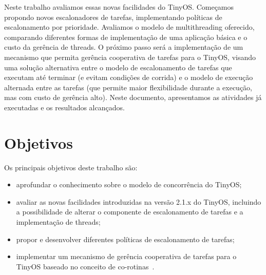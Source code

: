 \documentclass[a4paper, 10pt]{article}
\begin{document}
Neste trabalho avaliamos essas novas facilidades do TinyOS.
Começamos propondo novos escalonadores de tarefas, implementando políticas de escalonamento por
prioridade. Avaliamos o modelo de multithreading oferecido, comparando diferentes formas de implementação
de uma aplicação básica e o custo da gerência de threads. O próximo passo será a implementação
de um mecanismo que permita gerência cooperativa de tarefas para o TinyOS, visando 
uma solução alternativa entre o modelo de escalonamento de tarefas que executam até terminar 
(e evitam condições de corrida) e o modelo de execução alternada entre as tarefas 
(que permite maior flexibilidade durante a execução, mas com custo de gerência alto).
Neste documento, apresentamos as atividades já executadas e os resultados alcançados.

\section{Objetivos}\label{objetivos}
Os principais objetivos deste trabalho são:
\begin{itemize}
\item aprofundar o conhecimento sobre o modelo de concorrência do TinyOS;
\item avaliar as novas facilidades introduzidas na versão 2.1.x do TinyOS, 
incluindo a possibilidade de alterar o componente de escalonamento de tarefas e a implementação de threads;
\item propor e desenvolver diferentes políticas de escalonamento de tarefas;
\item implementar um mecanismo de gerência cooperativa de tarefas para o TinyOS baseado no 
conceito de co-rotinas~\cite{Rossetto/06}.
\end{itemize}

\end{document}

